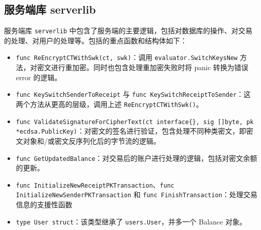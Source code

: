 \subsection{服务端库 serverlib}

服务端库 \verb|serverlib| 中包含了服务端的主要逻辑，包括对数据库的操作、对交易的处理、对用户的处理等。包括的重点函数和结构体如下：

\begin{itemize}
    \item \verb|func ReEncryptCTWithSwk(ct, swk)|：调用 \verb|evaluator.SwitchKeysNew| 方法，对密文进行重加密。同时也包含处理重加密失败时将 panic 转换为错误 error 的逻辑。
    \item \verb|func KeySwitchSenderToReceipt| 与 \verb|func KeySwitchReceiptToSender|：这两个方法从更高的层级，调用上述 \verb|ReEncryptCTWithSwk()|。
    \item \verb|func ValidateSignatureForCipherText(ct interface{}, sig []byte, pk *ecdsa.PublicKey)|：对密文的签名进行验证，包含处理不同种类密文，即密文对象和/或密文反序列化后的字节流的逻辑。
    \item \verb|func GetUpdatedBalance|：对交易后的账户进行处理的逻辑，包括对密文余额的更新。
    \item \verb|func InitializeNewReceiptPKTransaction|、\verb|func InitializeNewSenderPKTransaction| 和 \verb|func FinishTransaction|：处理交易信息的支援性函数
    \item \verb|type User struct|：该类型继承了 \verb|users.User|，并多一个 Balance 对象。
\end{itemize}
